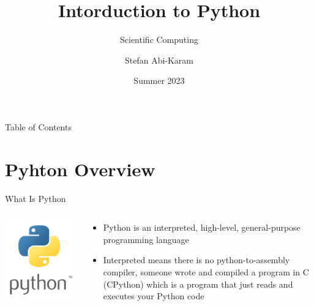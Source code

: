 \documentclass[aspectratio=169]{beamer}
\title{Intorduction to Python}
\subtitle{Scientific Computing}
\author{Stefan Abi-Karam}
\date{Summer 2023}
\begin{document}
\begin{frame}
    \titlepage
\end{frame}

\begin{frame}{Table of Contents}
    \tableofcontents
\end{frame}

\section{Pyhton Overview}

\begin{frame}{What Is Python}
    \begin{columns}
        \begin{column}{0.3\textwidth}
            \centering
            \includegraphics[width=\textwidth]{imgs/python_logo.png}
        \end{column}
        \begin{column}{0.7\textwidth}
            \begin{itemize}
                \item Python is an interpreted, high-level, general-purpose programming language
                \item Interpreted means there is no python-to-assembly compiler, someone wrote and compiled a program in C (CPython) which is a program that just reads and executes your Python code

\end{itemize}
\end{column}
\end{columns}
\end{frame}
\end{document}
